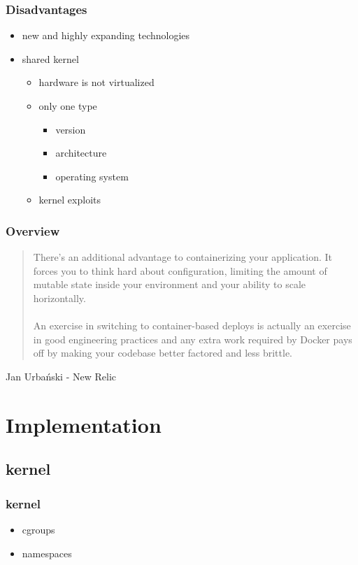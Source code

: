 \documentclass{beamer}
\begin{document}
\begin{frame}
    \frametitle{Disadvantages}
    \begin{itemize}
        \item new and highly expanding technologies
        \item shared kernel
        \begin{itemize}
            \item hardware is not virtualized
            \item only one type
            \begin{itemize}
                \item version
                \item architecture
                \item operating system
            \end{itemize}
            \item kernel exploits
        \end{itemize}
    \end{itemize}
\end{frame}

\begin{frame}
    \frametitle{Overview}
    \begin{quote}
        There’s an additional advantage to containerizing your application. It
        forces you to think hard about configuration, limiting the amount of
        mutable state inside your environment and your ability to scale
        horizontally.
        \\~\\
        An exercise in switching to container-based deploys is actually an
        exercise in good engineering practices and any extra work required by
        Docker pays off by making your codebase better factored and less
        brittle.
    \end{quote}
    Jan Urbański - New Relic
\end{frame}

\section{Implementation}

\subsection{kernel}

\begin{frame}
    \frametitle{kernel}
    \begin{itemize}
        \item cgroups
        \item namespaces
    \end{itemize}
\end{frame}
\end{document}
